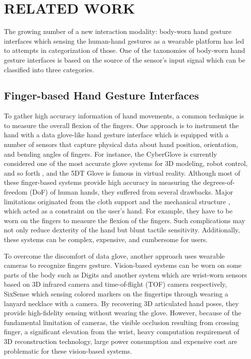 \documentclass{sigchi}
\begin{document}
\section{RELATED WORK}

The growing number of a new interaction modality: body-worn hand gesture interfaces which sensing the human-hand gestures as a wearable platform has led to attempts in categorization of those. One of the taxonomies of body-worn hand gesture interfaces is based on the source of the sensor's input signal which can be classified into three categories.

\subsection{Finger-based Hand Gesture Interfaces}
To gather high accuracy information of hand movements, a common technique is to measure the overall flexion of the fingers. One approach is to instrument the hand with a data glove-like hand gesture interface \cite{4539650, 1546364, 806717, tsukada2001ubi} which is equipped with a number of sensors that capture physical data about hand position, orientation, and bending angles of fingers.
For instance, the CyberGlove \cite{1414484} is currently considered one of the most accurate glove systems for 3D modeling, robot control, and so forth \cite{Burdea:2003:VRT:829566, LaViola:1999:SHP:864649}, and the 5DT Glove \cite{5DT} is famous in virtual reality. 
Although most of these finger-based systems provide high accuracy in measuring the degrees-of-freedom (DoF) of human hands, they suffered from several drawbacks. 
Major limitations originated from the cloth support and the mechanical structure \cite{4539650}
, which acted as a constraint on the user’s hand. For example, they have to be worn on the fingers to measure the flexion of the fingers. Such complications may not only reduce dexterity of the hand but blunt tactile sensitivity. Additionally, these systems can be complex, expensive, and cumbersome for users.

To overcome the discomfort of data glove, another approach uses wearable cameras to recognize fingers gesture. Vision-based systems can be worn on some parts of the body such as Digits \cite{Kim:2012:DFI:2380116.2380139}and another system \cite{6855631} which are wrist-worn sensors based on 3D infrared camera and time-of-flight (TOF) camera respectively, SixSense\cite{Mistry:2009:SWG:1667146.1667160} which sensing colored markers on the fingertips through wearing a lanyard necklace with a camera. By recovering 3D articulated hand poses, they provide high-fidelity sensing without wearing the glove. However, because of the fundamental limitation of cameras, the visible occlusion resulting from crossing finger, a significant elevation from the wrist, heavy computation requirement of 3D reconstruction technology, large power consumption and expensive cost are problematic for these vision-based systems.
\end{document}
